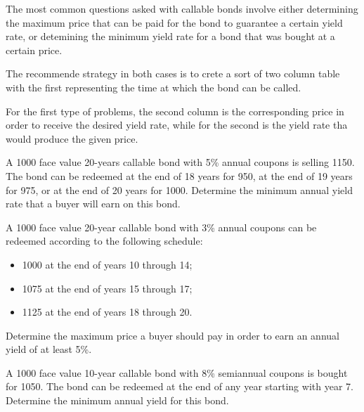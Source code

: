\documentclass[12pt,a4paper]{article}
\begin{document}
The most common questions asked with callable bonds involve either determining the maximum price that can be paid for the bond to guarantee a certain yield rate, or detemining the minimum yield rate for a bond that was bought at a certain price.

The recommende strategy in both cases is to crete a sort of two column table with the first representing the time at which the bond can be called.

For the first type of problems, the second column is the corresponding price in order to receive the desired yield rate, %
while for the second is the yield rate tha would produce the given price. %

\begin{question} A 1000 face value 20-years callable bond with 5\% annual coupons is selling 1150. The bond can be redeemed at the end of 18 years for 950, at the end of 19 years for 975, or at the end of 20 years for 1000. Determine the minimum annual yield rate that a buyer will earn on this bond.
\end{question}

\begin{question} A 1000 face value 20-year callable bond with 3\% annual coupons can be redeemed according to the following schedule:
\begin{itemize}
	\item 1000 at the end of years 10 through 14;
	\item 1075 at the end of years 15 through 17;
	\item 1125 at the end of years 18 through 20.
\end{itemize}
Determine the maximum price a buyer should pay in order to earn an annual yield of at least 5\%.
\end{question}

\begin{question} A 1000 face value 10-year callable bond with 8\% semiannual coupons is bought for 1050.  The bond can be redeemed at the end of any year starting with year 7.  Determine the minimum annual yield for this bond.
\end{question}
\end{document}
